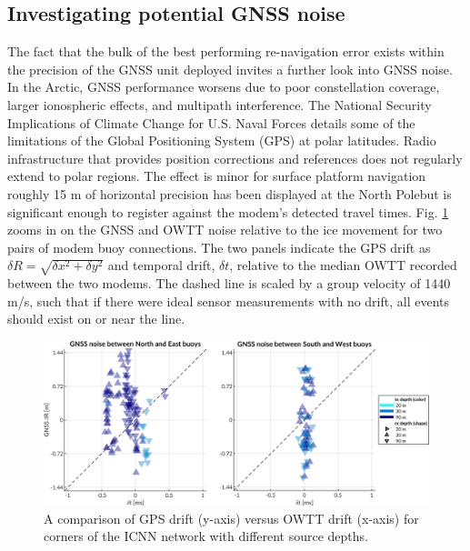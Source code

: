 \subsection{Investigating potential GNSS noise}

The fact that the bulk of the best performing re-navigation error exists within the precision of the GNSS unit deployed invites a further look into GNSS noise.
In the Arctic, GNSS performance worsens due to poor constellation coverage, larger ionospheric effects, and multipath interference.
The National Security Implications of Climate Change for U.S. Naval Forces \citep{NAP12914} details some of the limitations of the Global Positioning System (GPS) at polar latitudes.
Radio infrastructure that provides position corrections and references does not regularly extend to polar regions.
The effect is minor for surface platform navigation \textemdash roughly 15 m of horizontal precision has been displayed at the North Pole\textemdash but is significant enough to register against the modem's detected travel times.
Fig. \ref{fig:gps-drift-example} zooms in on the GNSS and OWTT noise relative to the ice movement for two pairs of modem buoy connections.
The two panels indicate the GPS drift as $\delta R = \sqrt{\delta x^2 + \delta y^2}$ and temporal drift, $\delta t$, relative to the median OWTT recorded between the two modems.
The dashed line is scaled by a group velocity of 1440 m/s, such that if there were ideal sensor measurements with no drift, all events should exist on or near the line.

\begin{figure}[h!]
	\centering
	\includegraphics[width=\columnwidth]{figs/gps-drift-example.pdf} 
	\caption{A comparison of GPS drift (y-axis) versus OWTT drift (x-axis) for corners of the ICNN network with different source depths.}
	\label{fig:gps-drift-example}
\end{figure}

